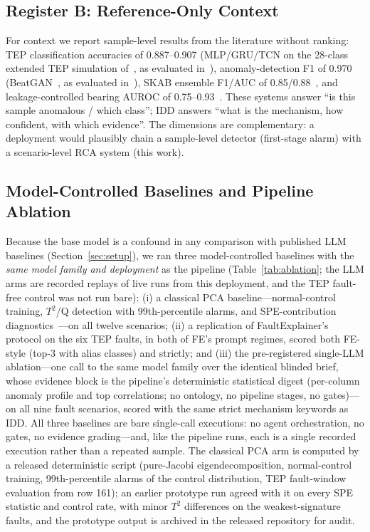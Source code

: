 \documentclass[preprint,10pt]{elsarticle}
\begin{document}
\subsection{Register B: Reference-Only Context}
For context we report sample-level results from the literature without ranking: TEP classification accuracies of 0.887--0.907 (MLP/GRU/TCN on the 28-class extended TEP simulation of~\cite{rieth2017additional}, as evaluated in~\cite{pozdnyakov2024adversarial}), anomaly-detection F1 of 0.970 (BeatGAN~\cite{zhou2019beatgan}, as evaluated in~\cite{hartung2023deep}), SKAB ensemble F1/AUC of 0.85/0.88~\cite{iliopoulos2023detection}, and leakage-controlled bearing AUROC of 0.75--0.93~\cite{vieira2026towards}. These systems answer ``is this sample anomalous / which class''; IDD answers ``what is the mechanism, how confident, with which evidence''. The dimensions are complementary: a deployment would plausibly chain a sample-level detector (first-stage alarm) with a scenario-level RCA system (this work).

\subsection{Model-Controlled Baselines and Pipeline Ablation}\label{sec:ablation}
Because the base model is a confound in any comparison with published LLM baselines (Section~\ref{sec:setup}), we ran three model-controlled baselines with the \emph{same model family and deployment} as the pipeline (Table~\ref{tab:ablation}; the LLM arms are recorded replays of live runs from this deployment, and the TEP fault-free control was not run bare): (i) a classical PCA baseline---normal-control training, $T^2$/Q detection with 99th-percentile alarms, and SPE-contribution diagnostics~\cite{chiang2001fault,qin2012survey}---on all twelve scenarios; (ii) a replication of FaultExplainer's protocol on the six TEP faults, in both of FE's prompt regimes, scored both FE-style (top-3 with alias classes) and strictly; and (iii) the pre-registered single-LLM ablation---one call to the same model family over the identical blinded brief, whose evidence block is the pipeline's deterministic statistical digest (per-column anomaly profile and top correlations; no ontology, no pipeline stages, no gates)---on all nine fault scenarios, scored with the same strict mechanism keywords as IDD. All three baselines are bare single-call executions: no agent orchestration, no gates, no evidence grading---and, like the pipeline runs, each is a single recorded execution rather than a repeated sample. The classical PCA arm is computed by a released deterministic script (pure-Jacobi eigendecomposition, normal-control training, 99th-percentile alarms of the control distribution, TEP fault-window evaluation from row 161); an earlier prototype run agreed with it on every SPE statistic and control rate, with minor $T^2$ differences on the weakest-signature faults, and the prototype output is archived in the released repository for audit.
\end{document}
